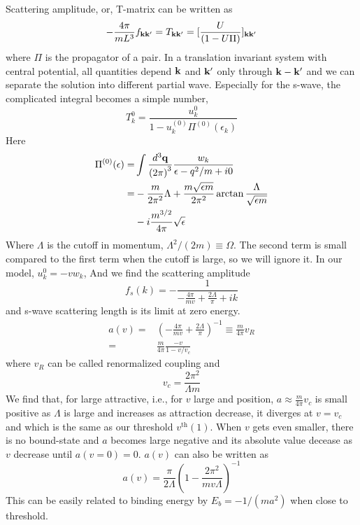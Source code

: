 Scattering amplitude, or, T-matrix can be written as 
\begin{equation}
-\frac{4\pi}{mL^3}f_{\mathbf{k}\mathbf{k}'}=T_{\mathbf{k}\mathbf{k}'}=[\frac{U}{(1-U\Pi)}]_{\mathbf{k}\mathbf{k}'}
\end{equation}
where $\Pi$ is the propagator of a pair.  In a translation invariant system with central potential, all quantities depend $\mathbf{k}$ and $\mathbf{k}'$ only through $\mathbf{k}-\mathbf{k}'$ and we can separate the solution into different partial wave. Especially for the s-wave, the complicated  integral becomes a simple number,
\begin{equation}
T^{0}_{k}=\frac{u^{0}_{k}}{1-u^{(0)}_{k}\Pi^{(0)}(\epsilon_k)}
\end{equation}
Here 
\begin{equation}
\begin{split}
\Pi^{(0)}(\epsilon)=&\int\frac{d^{3}\mathbf{q}}{{(2\pi)}^{3}}\frac{w_{k}}{\epsilon-q^{2}/m+i0}\\
=&-\frac{m}{2\pi^{2}}{\Lambda}+\frac{m\sqrt{\epsilon{m}}}{2\pi^{2}}\arctan\frac{\Lambda}{\sqrt{\epsilon{m}}}\\
&-i\frac{m^{3/2}}{4\pi}\sqrt{\epsilon}
\end{split}
\end{equation}
Where $\Lambda$ is the cutoff in momentum, $\Lambda^{2}/(2m)\equiv\Omega$. The second term is small compared to the first term when the cutoff is large, so we will ignore it.  In our model, $u^{0}_{k}=-vw_{k}$, And we find the scattering amplitude 
\begin{equation}
f_{s}(k)=-\frac{1}{-\frac{4\pi}{mv}+\frac{2\Lambda}{\pi}+ik}
\end{equation}
and s-wave scattering length is its limit at zero energy. 
\begin{equation}
\begin{split}
a(v)=&\left(-\frac{4\pi}{mv}+\frac{2\Lambda}{\pi}\right)^{-1}\equiv\frac{m}{4\pi}v_{R}\\
     =&\frac{m}{4\pi}\frac{-v}{1-v/v_{c}}
     \end{split}
\end{equation}
where $v_{R}$ can be called renormalized coupling and 
\begin{equation}
v_{c}=\frac{2\pi^{2}}{\Lambda{m}}
\end{equation}
We find that, for large attractive, i.e., for $v$ large and position, $a\approx\frac{m}{4\pi}v_c$ is small positive as $\Lambda$ is large and increases as attraction decrease, it diverges at $v=v_{c}$ and which is the same as our threshold $v^{\text{th}}(1)$.  When $v$ gets even smaller, there is no bound-state and $a$ becomes large negative and its absolute value decease as $v$ decrease until $a(v=0)=0$. 
$a(v)$ can also be written as
\begin{equation}
a(v)=\frac{\pi}{2\Lambda}\left(1-\frac{2\pi^{2}}{mv\Lambda}\right)^{-1}
\end{equation}
This can be easily related to binding energy by $E_{b}=-1/(ma^{2})$ when close to threshold. 